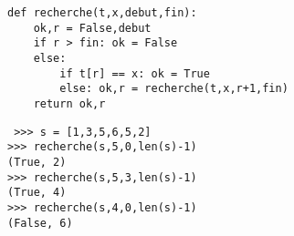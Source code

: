\noindent\mbox{}\hspace*{1cm}\begin{py}{8cm}
\begin{verbatim}
def recherche(t,x,debut,fin):
    ok,r = False,debut
    if r > fin: ok = False
    else:
        if t[r] == x: ok = True
        else: ok,r = recherche(t,x,r+1,fin)
    return ok,r
\end{verbatim}
\end{py}
\hfill
\begin{py}{7cm}\tt
>>> s = [1,3,5,6,5,2]\\
>>> recherche(s,5,0,len(s)-1)\\
(True, 2)\\
>>> recherche(s,5,3,len(s)-1)\\
(True, 4)\\
>>> recherche(s,4,0,len(s)-1)\\
(False, 6)
\end{py}\\
